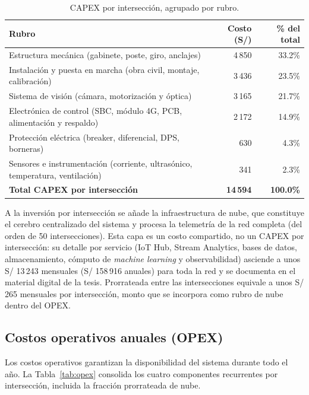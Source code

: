 \begin{table}[H]
  \centering
  \footnotesize
  \caption{CAPEX por intersección, agrupado por rubro.}
  \label{tab:capex}
  \begin{tabularx}{\linewidth}{@{}X r r@{}}
    \toprule
    \textbf{Rubro} & \textbf{Costo (S/)} & \textbf{\% del total}\\
    \midrule
    Estructura mecánica (gabinete, poste, giro, anclajes) & 4\,850 & 33.2\%\\
    Instalación y puesta en marcha (obra civil, montaje, calibración) & 3\,436 & 23.5\%\\
    Sistema de visión (cámara, motorización y óptica) & 3\,165 & 21.7\%\\
    Electrónica de control (SBC, módulo 4G, PCB, alimentación y respaldo) & 2\,172 & 14.9\%\\
    Protección eléctrica (breaker, diferencial, DPS, borneras) & 630 & 4.3\%\\
    Sensores e instrumentación (corriente, ultrasónico, temperatura, ventilación) & 341 & 2.3\%\\
    \midrule
    \textbf{Total CAPEX por intersección} & \textbf{14\,594} & \textbf{100.0\%}\\
    \bottomrule
  \end{tabularx}
\end{table}

A la inversión por intersección se añade la infraestructura de nube, que constituye el cerebro
centralizado del sistema y procesa la telemetría de la red completa (del orden de 50
intersecciones). Esta capa es un costo compartido, no un CAPEX por intersección: su detalle por
servicio (IoT Hub, Stream Analytics, bases de datos, almacenamiento, cómputo de \emph{machine
learning} y observabilidad) asciende a unos S/ 13\,243 mensuales (S/ 158\,916 anuales) para toda
la red y se documenta en el material digital de la tesis. Prorrateada entre las intersecciones equivale a unos
S/ 265 mensuales por intersección, monto que se incorpora como rubro de nube dentro del OPEX.

\subsection{Costos operativos anuales (OPEX)}

Los costos operativos garantizan la disponibilidad del sistema durante todo el año. La
Tabla~\ref{tab:opex} consolida los cuatro componentes recurrentes por intersección, incluida
la fracción prorrateada de nube.

